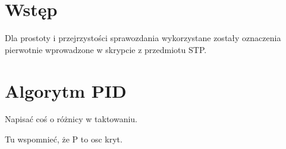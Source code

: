 \chapter{Wstęp}
Dla prostoty i przejrzystości sprawozdania wykorzystane zostały oznaczenia pierwotnie wprowadzone w skrypcie z przedmiotu STP\@.

\chapter{Algorytm PID}

Napisać coś o różnicy w taktowaniu.
\begin{figure}[H]
\centering

\end{figure}

\begin{figure}[H]
\centering

\end{figure}

Tu wspomnieć, że P to osc kryt.
\begin{figure}[H]
\centering

\end{figure}

\begin{figure}[H]
\centering

\end{figure}

\begin{figure}[H]
\centering

\end{figure}

\begin{figure}[H]
\centering

\end{figure}

\begin{figure}[H]
\centering

\end{figure}


\begin{figure}[H]
\centering

\end{figure}

\begin{figure}[H]
\centering

\end{figure}

\begin{figure}[H]
\centering

\end{figure}


\begin{figure}[H]
\centering

\end{figure}

